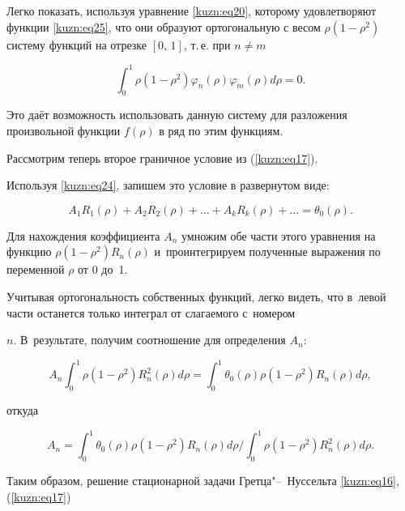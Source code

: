 Легко показать, используя уравнение \eqref{kuzn:eq20}, которому удовлетворяют функции \eqref{kuzn:eq25}, что они образуют ортогональную с весом $\rho(1-\rho^2)$ систему функций на отрезке $[0,\, 1]$, т.\,е. при $n  \ne  m$

\begin{equation}

\label{kuzn:eq26}

 \int_0^1 \rho(1-\rho^2) \varphi _n (\rho )\varphi _m (\rho )d\rho =0.

\end{equation}

Это даёт возможность использовать данную систему для разложения произвольной функции $f(\rho)$ в ряд по этим функциям.



Рассмотрим теперь второе граничное условие из (\ref{kuzn:eq17}). 

Используя \eqref{kuzn:eq24}, запишем это условие в развернутом виде:

$$

A_1R_1(\rho) + A_2 R_2 (\rho) + \dots + A_k R_k (\rho) + \dots = \theta_0(\rho).

$$

Для нахождения коэффициента $A_n$ умножим обе части этого уравнения на функцию $\rho(1 - \rho^2)R_n (\rho)$ и~проинтегрируем полученные выражения по переменной $\rho $ от 0 до~1. 

Учитывая ортогональность собственных функций, легко видеть, что в~левой части останется только интеграл от слагаемого с~номером

$n$. В~результате, получим соотношение для определения $A_n$:

$$

A_n \int_0^1 \rho (1-\rho^2)R_n^2 (\rho )d\rho =\int_0^1 \theta _0 (\rho )\rho (1-\rho ^2)R_n

(\rho )d\rho,

$$

откуда 

\begin{equation}

\label{kuzn:eq27}

 A_n =\int_0^1 \theta _0 (\rho )\rho (1-\rho ^2)R_n (\rho )d\rho \Bigg / {\int_0^1 \rho ( 1-\rho ^2)R_n^2 (\rho

)d\rho}.

\end{equation}



Таким образом, решение стационарной задачи Гретца"--~Нуссельта \eqref{kuzn:eq16}, (\ref{kuzn:eq17})

